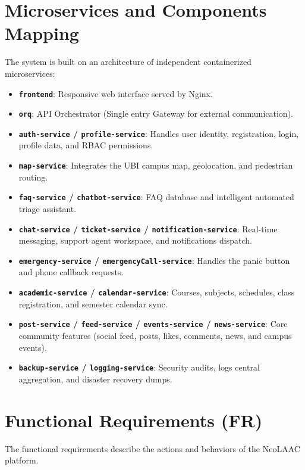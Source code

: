 \section{Microservices and Components Mapping}
The system is built on an architecture of independent containerized microservices:
\begin{itemize}
    \item \textbf{\texttt{frontend}}: Responsive web interface served by Nginx.
    \item \textbf{\texttt{orq}}: \ac{API} Orchestrator (Single entry Gateway for external communication).
    \item \textbf{\texttt{auth-service} / \texttt{profile-service}}: Handles user identity, registration, login, profile data, and \ac{RBAC} permissions.
    \item \textbf{\texttt{map-service}}: Integrates the \ac{UBI} campus map, geolocation, and pedestrian routing.
    \item \textbf{\texttt{faq-service} / \texttt{chatbot-service}}: \ac{FAQ} database and intelligent automated triage assistant.
    \item \textbf{\texttt{chat-service} / \texttt{ticket-service} / \texttt{notification-service}}: Real-time messaging, support agent workspace, and notifications dispatch.
    \item \textbf{\texttt{emergency-service} / \texttt{emergencyCall-service}}: Handles the panic button and phone callback requests.
    \item \textbf{\texttt{academic-service} / \texttt{calendar-service}}: Courses, subjects, schedules, class registration, and semester calendar sync.
    \item \textbf{\texttt{post-service} / \texttt{feed-service} / \texttt{events-service} / \texttt{news-service}}: Core community features (social feed, posts, likes, comments, news, and campus events).
    \item \textbf{\texttt{backup-service} / \texttt{logging-service}}: Security audits, logs central aggregation, and disaster recovery dumps.
\end{itemize}

\newpage

\section{Functional Requirements (FR)}
The functional requirements describe the actions and behaviors of the Neo\ac{LAAC} platform.

